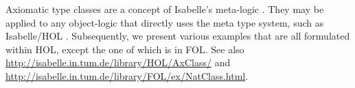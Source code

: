 Axiomatic type classes are a concept of Isabelle's meta-logic
\cite{paulson-isa-book,Wenzel:1997:TPHOL}.  They may be applied to any
object-logic that directly uses the meta type system, such as Isabelle/HOL
\cite{isabelle-HOL}.  Subsequently, we present various examples that are all
formulated within HOL, except the one of  which is in
FOL.  See also \url{http://isabelle.in.tum.de/library/HOL/AxClass/} and
\url{http://isabelle.in.tum.de/library/FOL/ex/NatClass.html}.



















